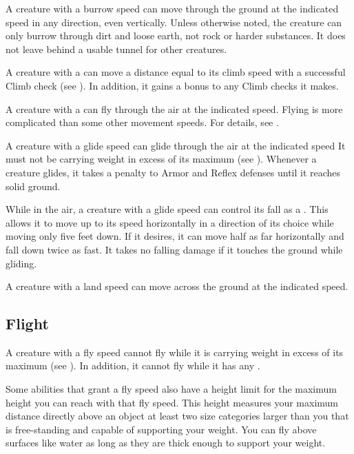         A creature with a burrow speed can move through the ground at the indicated speed in any direction, even vertically. Unless otherwise noted, the creature can only burrow through dirt and loose earth, not rock or harder substances. It does not leave behind a usable tunnel for other creatures.

        A creature with a  can move a distance equal to its climb speed with a successful Climb check (see ).
        In addition, it gains a  bonus to any Climb checks it makes.

        A creature with a  can fly through the air at the indicated speed.
        Flying is more complicated than some other movement speeds.
        For details, see .

        \label{Gliding}
        A creature with a glide speed can glide through the air at the indicated speed
        It must not be carrying weight in excess of its maximum  (see ).
        Whenever a creature glides, it takes a  penalty to Armor and Reflex defenses until it reaches solid ground.

        While in the air, a creature with a glide speed can control its fall as a . This allows it to move up to its speed horizontally in a direction of its choice while moving only five feet down. If it desires, it can move half as far horizontally and fall down twice as fast. It takes no falling damage if it touches the ground while gliding.

        A creature with a land speed can move across the ground at the indicated speed.

    \subsection{Flight}\label{Flight}
        A creature with a fly speed cannot fly while it is carrying weight in excess of its maximum  (see ).
        In addition, it cannot fly while it has any .

         Some abilities that grant a fly speed also have a height limit for the maximum height you can reach with that fly speed.
        This height measures your maximum distance directly above an object at least two size categories larger than you that is free-standing and capable of supporting your weight.
        You can fly above surfaces like water as long as they are thick enough to support your weight.

